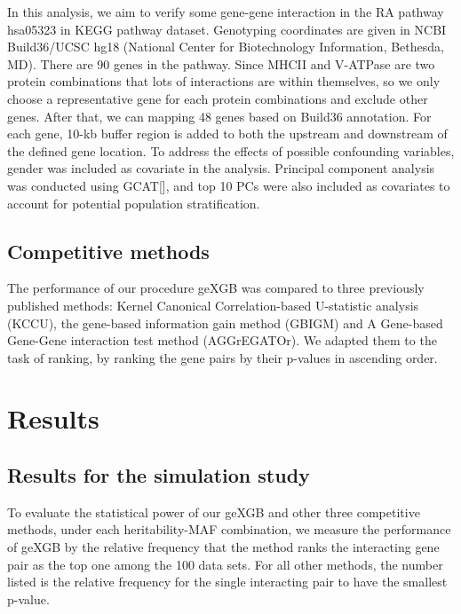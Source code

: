 \documentclass[11pt]{article}
\theoremstyle{plain}
\theoremstyle{definition}
\theoremstyle{remark}
\begin{document}
\noindent In this analysis, we aim to verify some gene-gene interaction in the RA pathway hsa05323 in KEGG pathway dataset. Genotyping coordinates are given in NCBI Build36/UCSC hg18 (National Center for Biotechnology Information, Bethesda, MD). There are 90 genes in the pathway. Since MHCII and V-ATPase are two protein combinations that lots of interactions are within themselves, so we only choose a representative gene for each protein combinations and exclude other genes. After that, we can mapping 48 genes based on Build36 annotation. For each gene, 10-kb buffer region is added to both the upstream and downstream of the defined gene location. To address the effects of possible confounding variables, gender was included as covariate in the analysis. Principal component analysis was conducted using GCAT[], and top 10 PCs were also included as covariates to account for potential population stratification.\\

\subsection{Competitive methods}
The performance of our procedure geXGB was compared to three previously published methods: Kernel Canonical Correlation-based U-statistic analysis (KCCU)\cite{4, 5}, the gene-based information gain method (GBIGM)\cite{6} and A Gene-based Gene-Gene interaction test method (AGGrEGATOr)\cite{7}. We adapted them to the task of ranking, by ranking the gene pairs by their p-values in ascending order.

\section{Results}

\subsection{Results for the simulation study}

To evaluate the statistical power of our geXGB and other three competitive methods, under each heritability-MAF combination, we measure the performance of geXGB by the relative frequency that the method ranks the interacting gene pair as the top one among the 100 data sets. For all other methods, the number listed is the relative frequency for the single interacting pair to have the smallest p-value.\\
\end{document}
